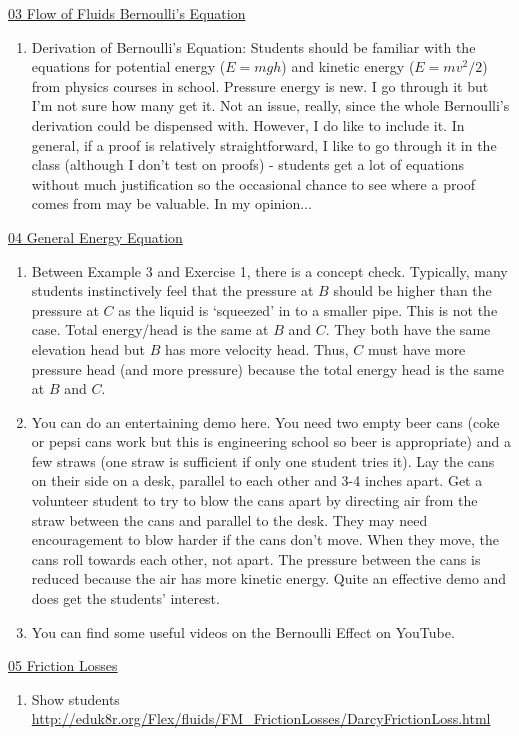 \documentclass[9pt,oneside]{amsart}
\begin{document}
\underline{03 Flow of Fluids Bernoulli's Equation}
\begin{enumerate}
	\item Derivation of Bernoulli's Equation: Students should be familiar with the equations for potential energy ($E=mgh$) and kinetic energy ($E=mv^2/2$) from physics courses in school. Pressure energy is new. I go through it but I'm not sure how many get it. Not an issue, really, since the whole Bernoulli's derivation could be dispensed with. However, I do like to include it. \parm\noindent
	In general, if a proof is relatively straightforward, I like to go through it in the class (although I don't test on proofs) - students get a lot of equations without much justification so the occasional chance to see where a proof comes from may be valuable. In my opinion...
\end{enumerate}

\underline{04 General Energy Equation}
\begin{enumerate}
	\item  Between Example 3 and Exercise 1, there is a concept check. Typically, many students instinctively feel that the pressure at $B$ should be higher than the pressure at $C$ as the liquid is `squeezed' in to a smaller pipe. This is not the case.\parm\noindent
	Total energy/head is the same at $B$ and $C$. They both have the same elevation head but $B$ has more velocity head. Thus, $C$ must have more pressure head (and more pressure) because the total energy head is the same at $B$ and $C$.\parm
	\item You can do an entertaining demo here. You need two empty beer cans (coke or pepsi cans work but this is engineering school so beer is appropriate) and a few straws (one straw is sufficient if only one student tries it). Lay the cans on their side on a desk, parallel to each other and 3-4 inches apart. Get a volunteer student to try to blow the cans apart by directing air from the straw between the cans and parallel to the desk. They may need encouragement to blow harder if the cans don't move. When they move, the cans roll towards each other, not apart. The pressure between the cans is reduced because the air has more kinetic energy. Quite an effective demo and does get the students' interest.	\parm
	\item You can find some useful videos on the Bernoulli Effect on YouTube.
\end{enumerate}

\underline{05 Friction Losses}
\begin{enumerate}
	\item Show students \url{http://eduk8r.org/Flex/fluids/FM_FrictionLosses/DarcyFrictionLoss.html}
\end{enumerate}
\end{document}
